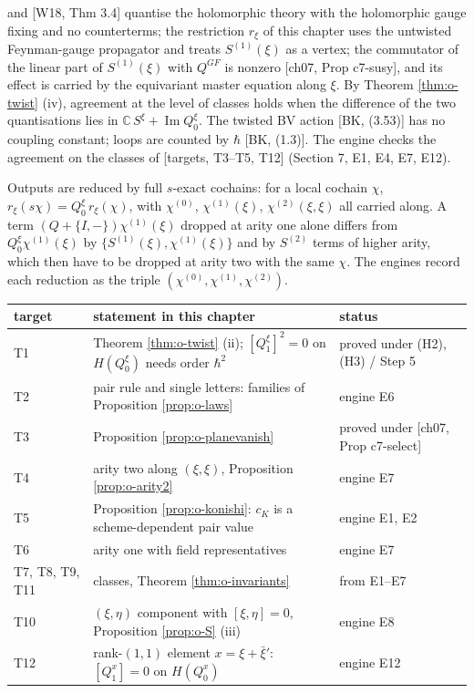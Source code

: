 \begin{remark} and [W18, Thm 3.4] quantise the holomorphic theory with the holomorphic gauge fixing and no counterterms; the restriction $r_\xi$ of this chapter uses the untwisted Feynman-gauge propagator and treats $S^{(1)}(\xi)$ as a vertex; the commutator of the linear part of $S^{(1)}(\xi)$ with $Q^{GF}$ is nonzero [ch07, Prop c7-susy], and its effect is carried by the equivariant master equation along $\xi$. By Theorem \ref{thm:o-twist} (iv), agreement at the level of classes holds when the difference of the two quantisations lies in $\mathbb C\,S^\xi+\operatorname{Im}Q^\xi_0$. The twisted BV action [BK, (3.53)] has no coupling constant; loops are counted by $\hbar$ [BK, (1.3)]. The engine checks the agreement on the classes of [targets, T3--T5, T12] (Section 7, E1, E4, E7, E12).
\end{remark}

\begin{remark}
\label{rem:o-exact}
Outputs are reduced by full $s$-exact cochains: for a local cochain $\chi$, $r_\xi(s\chi)=Q^\xi_0\,r_\xi(\chi)$, with $\chi^{(0)}$, $\chi^{(1)}(\xi)$, $\chi^{(2)}(\xi,\xi)$ all carried along. A term $(Q+\{I,-\})\chi^{(1)}(\xi)$ dropped at arity one alone differs from $Q^\xi_0\chi^{(1)}(\xi)$ by $\{S^{(1)}(\xi),\chi^{(1)}(\xi)\}$ and by $S^{(2)}$ terms of higher arity, which then have to be dropped at arity two with the same $\chi$. The engines record each reduction as the triple $(\chi^{(0)},\chi^{(1)},\chi^{(2)})$.
\end{remark}

\begin{tabular}{l|l|l}
target & statement in this chapter & status \\
\hline
T1 & Theorem \ref{thm:o-twist} (ii); $[Q^\xi_1]^2=0$ on $H(Q^\xi_0)$ needs order $\hbar^2$ & proved under (H2), (H3) / Step 5 \\
T2 & pair rule and single letters: families of Proposition \ref{prop:o-laws} & engine E6 \\
T3 & Proposition \ref{prop:o-planevanish} & proved under [ch07, Prop c7-select] \\
T4 & arity two along $(\xi,\xi)$, Proposition \ref{prop:o-arity2} & engine E7 \\
T5 & Proposition \ref{prop:o-konishi}: $c_K$ is a scheme-dependent pair value & engine E1, E2 \\
T6 & arity one with field representatives & engine E7 \\
T7, T8, T9, T11 & classes, Theorem \ref{thm:o-invariants} & from E1--E7 \\
T10 & $(\xi,\eta)$ component with $[\xi,\eta]=0$, Proposition \ref{prop:o-S} (iii) & engine E8 \\
T12 & rank-$(1,1)$ element $x=\xi+\bar\xi'$: $[Q^x_1]=0$ on $H(Q^x_0)$ & engine E12 \\
\end{tabular}

